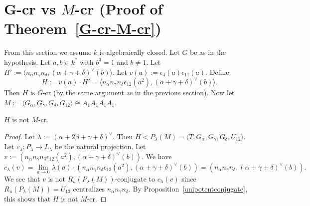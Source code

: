 \section{G-cr vs $M$-cr (Proof of Theorem~\ref{G-cr-M-cr})}
From this section we assume $k$ is algebraically closed. Let $G$ be as in the hypothesis. Let $a, b\in k^{*}$ with $b^3=1$ and $b\neq 1$. Let $H':=\langle n_\alpha n_\gamma n_\delta, (\alpha+\gamma+\delta)^{\vee}(b) \rangle$. Let $v(a):=\epsilon_4(a)\epsilon_{11}(a)$. Define
\begin{equation*}
H:=v(a)\cdot H' = \langle n_\alpha n_\gamma n_\delta \epsilon_{12}(a^2), (\alpha+\gamma+\delta)^{\vee}(b)\rangle.  
\end{equation*}
Then $H$ is $G$-cr (by the same argument as in the previous section). Now let $M:=\langle G_{\alpha}, G_{\gamma}, G_{\delta}, G_{12}\rangle\cong A_1 A_1 A_1 A_1$. 
\begin{prop}
$H$ is not $M$-cr. 
\end{prop}
\begin{proof}
Let $\lambda:=(\alpha+2\beta+\gamma+\delta)^{\vee}$. Then $H<P_\lambda(M)=\langle T, G_{\alpha}, G_{\gamma}, G_{\delta}, U_{12}\rangle$. Let $c_\lambda: P_\lambda\rightarrow L_\lambda$ be the natural projection. Let $v:=(n_\alpha n_\gamma n_\delta \epsilon_{12}(a^2), (\alpha+\gamma+\delta)^{\vee}(b))$. We have
\begin{equation*}
c_\lambda(v)=\lim_{a\rightarrow 0}\lambda(a)\cdot (n_\alpha n_\gamma n_\delta \epsilon_{12}(a^2), (\alpha+\gamma+\delta)^{\vee}(b))= (n_\alpha n_\gamma n_\delta, (\alpha+\gamma+\delta)^{\vee}(b)).
\end{equation*}
We see that $v$ is not $R_u(P_\lambda(M))$-conjugate to $c_\lambda(v)$ since $R_u(P_\lambda (M))=U_{12}$ centralizes $n_\alpha n_\gamma n_\delta$. By Proposition~\ref{unipotentconjugate}, this shows that $H$ is not $M$-cr. 
\end{proof}
  


